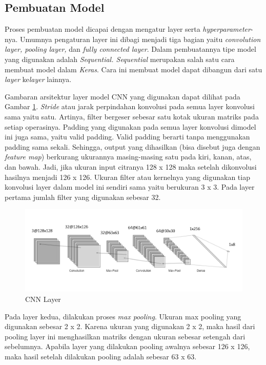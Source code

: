 \subsection{Pembuatan Model}

Proses pembuatan model dicapai dengan mengatur layer serta \emph{hyperparameter}-nya. Umumnya pengaturan layer ini dibagi menjadi tiga bagian yaitu \emph{convolution layer, pooling layer,} dan \emph{fully connected layer}. Dalam pembuatannya tipe model yang digunakan adalah \emph{Sequential. Sequential} merupakan salah satu cara membuat model dalam \emph{Keras}. Cara ini membuat model dapat dibangun dari satu \emph{layer} ke\emph{layer} lainnya.

Gambaran arsitektur layer model CNN yang digunakan dapat dilihat pada Gambar \ref{fig:cnnlayer}. \emph{Stride} atau jarak perpindahan konvolusi pada semua layer konvolusi sama yaitu satu. Artinya, filter bergeser sebesar satu kotak ukuran matriks pada setiap operasinya. Padding yang digunakan pada semua layer konvolusi dimodel ini juga sama, yaitu valid padding. Valid padding berarti tanpa menggunakan padding sama sekali. Sehingga, output yang dihasilkan (bisa disebut juga dengan \emph{feature map}) berkurang ukurannya masing-masing satu pada kiri, kanan, atas, dan bawah. Jadi, jika ukuran input citranya 128 x 128 maka setelah dikonvolusi hasilnya menjadi 126 x 126. Ukuran filter atau kernelnya yang digunakan tiap konvolusi layer dalam model ini sendiri sama yaitu berukuran 3 x 3. Pada layer pertama jumlah filter yang digunakan sebesar 32. 

\begin{figure} [ht]
  \centering
  \includegraphics[scale=0.75]{gambar/cnn-layer.png}
  \caption{CNN Layer}
  \label{fig:cnnlayer}
\end{figure}

Pada layer kedua, dilakukan proses \emph{max pooling}. Ukuran max pooling yang digunakan sebesar 2 x 2. Karena ukuran yang digunakan 2 x 2, maka hasil dari pooling layer ini menghasilkan matriks dengan ukuran sebesar setengah dari sebelumnya. Apabila layer yang dilakukan pooling awalnya sebesar 126 x 126, maka hasil setelah dilakukan pooling adalah sebesar 63 x 63.

